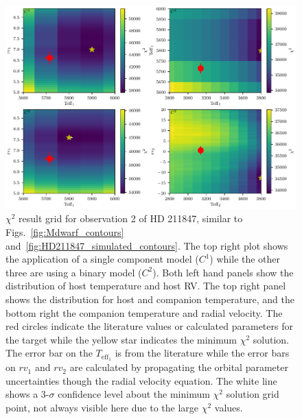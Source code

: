 \documentclass[fleqn,usenatbib]{mnras}
\begin{document}
\begin{figure}
    \centering
    \includegraphics[width=\linewidth]{images/HD211847_result_pcolors.pdf}
    \caption{\(\chi^2\) result grid for observation 2 of {HD 211847}, similar to Figs.~\ref{fig:Mdwarf_contours} and~\ref{fig:HD211847_simulated_contours}. The top right plot shows the application of a single component model (\(C^1\)) while the other three are using a binary model (\(C^2\)). Both left hand panels show the distribution of host temperature and host RV. The top right panel shows the distribution for host and companion temperature, and the bottom right the companion temperature and radial velocity. The red circles indicate the literature values or calculated parameters for the target while the yellow star indicates the minimum \(\chi^2\) solution. The error bar on the \(T_{\textrm{eff}_1}\) is from the literature while the error bars on \({rv}_1\) and \({rv}_2\) are calculated by propagating the orbital parameter uncertainties though the radial velocity equation. The white line shows a 3-\(\sigma\) confidence level about the minimum \(\chi^2\) solution grid point, not always visible here due to the large \(\chi^2\) values.}
    \label{fig:HD211847_result_contours}
\end{figure}
\end{document}
